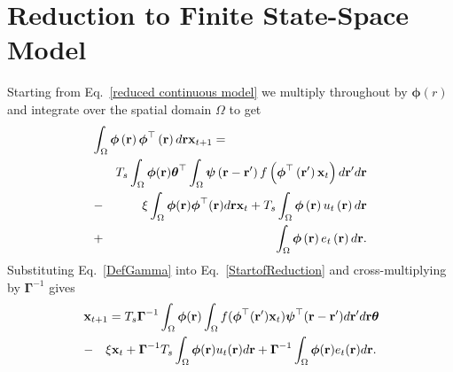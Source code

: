 \documentclass[12pt]{iopart}
\begin{document}
\section{Reduction to Finite State-Space Model}\label{Simplifying Decomposition} Starting from Eq.~\ref{reduced continuous model} we multiply throughout by $\boldsymbol{\phi}(r)$ and integrate over the spatial domain $\Omega$ to get 
\begin{eqnarray}
	\label{StartofReduction}\lefteqn{ \int_\Omega {\boldsymbol{\phi} \left(\mathbf{r}\right)\boldsymbol{\phi}^{\top}\left(\mathbf{r}\right) d\mathbf{r}} \mathbf{x}_{t+1}=} \nonumber\\
 &&T_s \int_\Omega {\boldsymbol{\phi} (\mathbf{r}) \boldsymbol{\theta}^{\top} \int_\Omega {\boldsymbol{\psi} \left(\mathbf{r}-\mathbf{r}'\right) f\left(\boldsymbol{\phi}^{\top}\left(\mathbf{r}'\right) \mathbf{x}_t \right)d\mathbf{r}'}d\mathbf{r}} \nonumber\\
&-& \xi\int_\Omega {\boldsymbol{\phi}(\mathbf{r})\boldsymbol{\phi}^{\top}(\mathbf{r})d\mathbf{r}} \mathbf{x}_t+T_s \int_\Omega{\boldsymbol{\phi} \left(\mathbf{r}\right) u_t\left(\mathbf{r}\right)d\mathbf{r}}\nonumber\\
&+&\int_\Omega{\boldsymbol{\phi} \left(\mathbf{r}\right) e_t\left(\mathbf{r}\right)d\mathbf{r}}. 
\end{eqnarray}
Substituting Eq.~\ref{DefGamma} into Eq.~\ref{StartofReduction} and cross-multiplying by $\boldsymbol{\Gamma}^{-1}$ gives 
\begin{eqnarray}\label{eq:ReducedForm}
	 \lefteqn{\mathbf{x}_{t+1} \nonumber= T_s\boldsymbol{\Gamma}^{ - 1}\int_\Omega {\boldsymbol{\phi}(\mathbf{r}) \int_\Omega {f(\boldsymbol{\phi}^{\top}(\mathbf{r}')\mathbf{x}_t) \boldsymbol{\psi}^{\top} (\mathbf{r}-\mathbf{r}')d\mathbf{r}'} d\mathbf{r}} \boldsymbol{\theta}} \nonumber\\
&-&\xi\mathbf{x}_t+\boldsymbol{\Gamma}^{-1}T_s\int_\Omega{\boldsymbol{\phi}(\mathbf{r}) u_t(\mathbf{r})d\mathbf{r}}\nonumber+\boldsymbol{\Gamma}^{-1} \int_\Omega{\boldsymbol{\phi}(\mathbf{r})e_t(\mathbf{r})d\mathbf{r}}.\\ 
\end{eqnarray}
\end{document}
